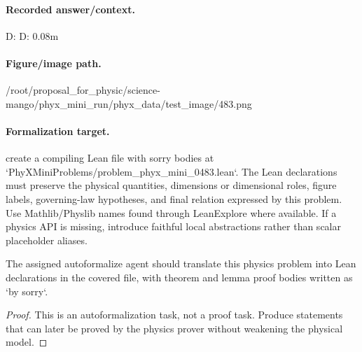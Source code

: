 \paragraph{Recorded answer/context.}
D: D: 0.08m

\paragraph{Figure/image path.}
/root/proposal\_for\_physic/science-mango/phyx\_mini\_run/phyx\_data/test\_image/483.png

\paragraph{Formalization target.}
create a compiling Lean file with sorry bodies at `PhyXMiniProblems/problem\_phyx\_mini\_0483.lean`. The Lean declarations must preserve the physical quantities, dimensions or dimensional roles, figure labels, governing-law hypotheses, and final relation expressed by this problem.
Use Mathlib/Physlib names found through LeanExplore where available. If a physics API is missing, introduce faithful local abstractions rather than scalar placeholder aliases.

\begin{theorem}
\label{thm:physics:phyx_mini_0483:target}
The assigned autoformalize agent should translate this physics problem into Lean declarations in the covered file, with theorem and lemma proof bodies written as `by sorry`.
\end{theorem}
\begin{proof}
This is an autoformalization task, not a proof task. Produce statements that can later be proved by the physics prover without weakening the physical model.
\end{proof}

